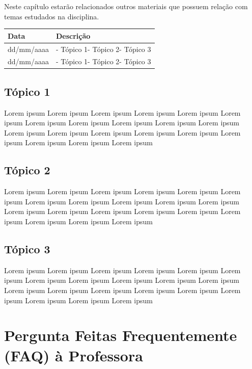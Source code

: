 \documentclass[
]{book}
\begin{document}
Neste capítulo estarão relacionados outros materiais que possuem relação com temas estudados na disciplina.

\begin{longtable}[]{@{}ll@{}}
\toprule()
Data & Descrição \\
\midrule()
\endhead
dd/mm/aaaa & - Tópico 1- Tópico 2- Tópico 3 \\
dd/mm/aaaa & - Tópico 1- Tópico 2- Tópico 3 \\
\bottomrule()
\end{longtable}

\hypertarget{tuxf3pico-1-1}{%
\section{Tópico 1}\label{tuxf3pico-1-1}}

Lorem ipsum Lorem ipsum Lorem ipsum Lorem ipsum Lorem ipsum Lorem ipsum Lorem ipsum Lorem ipsum Lorem ipsum Lorem ipsum Lorem ipsum Lorem ipsum Lorem ipsum Lorem ipsum Lorem ipsum Lorem ipsum Lorem ipsum Lorem ipsum Lorem ipsum Lorem ipsum

\hypertarget{tuxf3pico-2-1}{%
\section{Tópico 2}\label{tuxf3pico-2-1}}

Lorem ipsum Lorem ipsum Lorem ipsum Lorem ipsum Lorem ipsum Lorem ipsum Lorem ipsum Lorem ipsum Lorem ipsum Lorem ipsum Lorem ipsum Lorem ipsum Lorem ipsum Lorem ipsum Lorem ipsum Lorem ipsum Lorem ipsum Lorem ipsum Lorem ipsum Lorem ipsum

\hypertarget{tuxf3pico-3-1}{%
\section{Tópico 3}\label{tuxf3pico-3-1}}

Lorem ipsum Lorem ipsum Lorem ipsum Lorem ipsum Lorem ipsum Lorem ipsum Lorem ipsum Lorem ipsum Lorem ipsum Lorem ipsum Lorem ipsum Lorem ipsum Lorem ipsum Lorem ipsum Lorem ipsum Lorem ipsum Lorem ipsum Lorem ipsum Lorem ipsum Lorem ipsum

\hypertarget{pergunta-feitas-frequentemente-faq-uxe0-professora-1}{%
\chapter{Pergunta Feitas Frequentemente (FAQ) à Professora}\label{pergunta-feitas-frequentemente-faq-uxe0-professora-1}}
\end{document}
